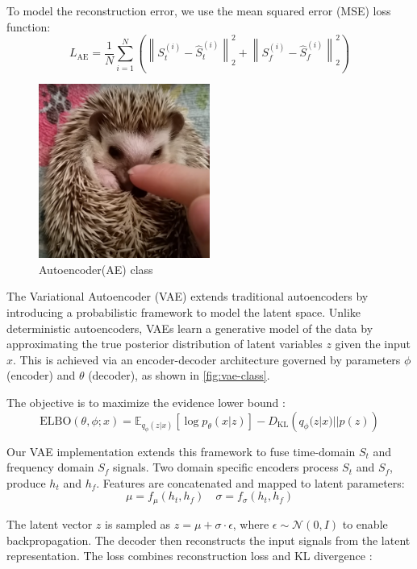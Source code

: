 \documentclass[12pt]{article}
\begin{document}
To model the reconstruction error, we use the mean squared error (MSE) loss function:
$$
L_{\text{AE}} = \frac{1}{N} \sum_{i=1}^{N} \left( \left\| S_{t}^{(i)} - \hat{S}_{t}^{(i)} \right\|_{2}^{2} + \left\| S_{f}^{(i)} - \hat{S}_{f}^{(i)} \right\|_{2}^{2} \right)
$$

\begin{figure}[htbp]
    \centering
    \includegraphics[width=0.5\textwidth]{dummy.png}
    \caption{Autoencoder(AE) class}
    \label{fig:ae-class}
\end{figure}

The Variational Autoencoder (VAE) extends traditional autoencoders by introducing a probabilistic framework to model the latent space. Unlike deterministic autoencoders, VAEs learn a generative model of the data by approximating the true posterior distribution of latent variables $z$ given the input $x$. This is achieved via an encoder-decoder architecture governed by parameters $\phi$(encoder) and $\theta$ (decoder), as shown in \autoref{fig:vae-class}.

The objective is to maximize the evidence lower bound : 
$$
\text{ELBO}(\theta,\phi;x) = \mathbb{E}_{q_{\phi}(z|x)} \left[ \log p_{\theta}(x|z) \right] -  D_{\text{KL}} \left( q_{\phi}(z|x) || p(z) \right)
$$

Our VAE implementation extends this framework to fuse time-domain $S_t  $ and frequency domain $S_f$ signals. Two domain specific encoders process $S_t$ and $S_f$, produce $h_t$ and $h_f$. Features are concatenated and mapped to latent parameters:
$$
\mu = f_{\mu}(h_t , h_f) \quad \sigma = f_{\sigma}(h_t , h_f)
$$

The latent vector $z$ is sampled as $z = \mu + \sigma \cdot \epsilon$, where $\epsilon \sim \mathcal{N}(0, I)$ to enable backpropagation. The decoder then reconstructs the input signals from the latent representation. The loss combines reconstruction loss and KL divergence :
\end{document}
